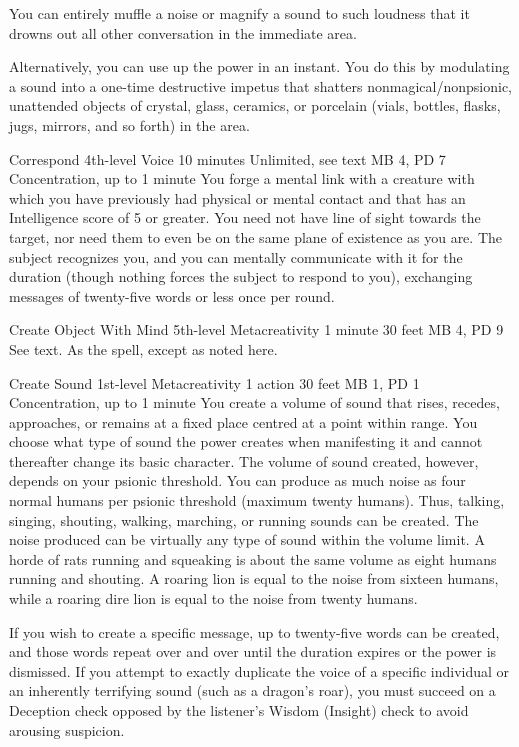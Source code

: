   You can entirely muffle a noise or magnify a sound to such loudness
  that it drowns out all other conversation in the immediate area.
  
  Alternatively, you can use up the power in an instant.
  You do this by modulating a sound into a one-time destructive impetus
  that shatters nonmagical/nonpsionic,
  unattended objects of crystal, glass, ceramics, or porcelain
  (vials, bottles, flasks, jugs, mirrors, and so forth) in the area.

\DndPowerHeader%
  {Correspond}
  {4th-level Voice}
  {10 minutes}
  {Unlimited, see text}
  {MB 4, PD 7}
  {Concentration, up to 1 minute}
  You forge a mental link with a creature with which you have
  previously had physical or mental contact
  and that has an Intelligence score of 5 or greater.
  You need not have line of sight towards the target,
  nor need them to even be on the same
  plane of existence as you are.
  The subject recognizes you, and you can mentally communicate
  with it for the duration
  (though nothing forces the subject to respond to you),
  exchanging messages of twenty-five words or less once per round.

\DndPowerHeader%
  {Create Object With Mind}
  {5th-level Metacreativity}
  {1 minute}
  {30 feet}
  {MB 4, PD 9}
  {See text.}
As the  spell,
except as noted here.

\DndPowerHeader%
  {Create Sound}
  {1st-level Metacreativity}
  {1 action}
  {30 feet}
  {MB 1, PD 1}
  {Concentration, up to 1 minute}
  You create a volume of sound that rises, recedes, approaches,
  or remains at a fixed place centred at a point within range.
  You choose what type of sound the power creates when manifesting it
  and cannot thereafter change its basic character.
  The volume of sound created, however, depends on your psionic threshold.
  You can produce as much noise as four normal humans per psionic threshold
  (maximum twenty humans).
  Thus, talking, singing, shouting, walking,
  marching, or running sounds can be created.
  The noise produced can be virtually any type of sound within the volume limit.
  A horde of rats running and squeaking is about the same volume as eight humans
  running and shouting.
  A roaring lion is equal to the noise from sixteen humans,
  while a roaring dire lion is equal to the noise from twenty humans.

  If you wish to create a specific message,
  up to twenty-five words can be created,
  and those words repeat over and over until the duration expires
  or the power is dismissed.
  If you attempt to exactly duplicate the voice of a specific individual
  or an inherently terrifying sound
  (such as a dragon's roar),
  you must succeed on a Deception check opposed
  by the listener's Wisdom (Insight) check to avoid arousing suspicion.
  
